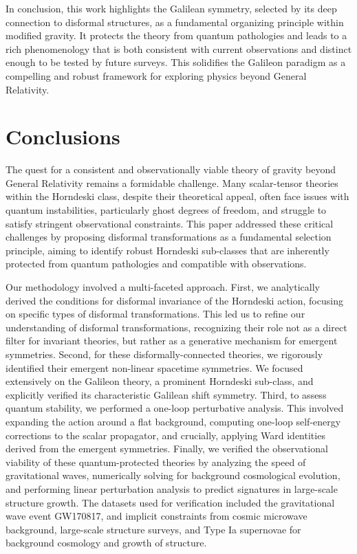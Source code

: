 \documentclass[twocolumn]{aastex631}
\begin{document}
In conclusion, this work highlights the Galilean symmetry, selected by its deep connection to disformal structures, as a fundamental organizing principle within modified gravity. It protects the theory from quantum pathologies and leads to a rich phenomenology that is both consistent with current observations and distinct enough to be tested by future surveys. This solidifies the Galileon paradigm as a compelling and robust framework for exploring physics beyond General Relativity.

\section{Conclusions}
\label{sec:conclusions}
The quest for a consistent and observationally viable theory of gravity beyond General Relativity remains a formidable challenge. Many scalar-tensor theories within the Horndeski class, despite their theoretical appeal, often face issues with quantum instabilities, particularly ghost degrees of freedom, and struggle to satisfy stringent observational constraints. This paper addressed these critical challenges by proposing disformal transformations as a fundamental selection principle, aiming to identify robust Horndeski sub-classes that are inherently protected from quantum pathologies and compatible with observations.

Our methodology involved a multi-faceted approach. First, we analytically derived the conditions for disformal invariance of the Horndeski action, focusing on specific types of disformal transformations. This led us to refine our understanding of disformal transformations, recognizing their role not as a direct filter for invariant theories, but rather as a generative mechanism for emergent symmetries. Second, for these disformally-connected theories, we rigorously identified their emergent non-linear spacetime symmetries. We focused extensively on the Galileon theory, a prominent Horndeski sub-class, and explicitly verified its characteristic Galilean shift symmetry. Third, to assess quantum stability, we performed a one-loop perturbative analysis. This involved expanding the action around a flat background, computing one-loop self-energy corrections to the scalar propagator, and crucially, applying Ward identities derived from the emergent symmetries. Finally, we verified the observational viability of these quantum-protected theories by analyzing the speed of gravitational waves, numerically solving for background cosmological evolution, and performing linear perturbation analysis to predict signatures in large-scale structure growth. The datasets used for verification included the gravitational wave event GW170817, and implicit constraints from cosmic microwave background, large-scale structure surveys, and Type Ia supernovae for background cosmology and growth of structure.
\end{document}
